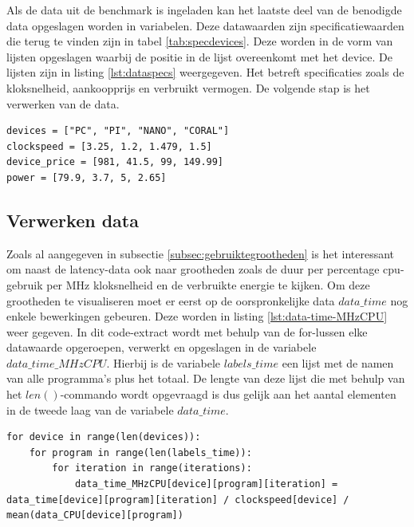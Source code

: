	Als de data uit de benchmark is ingeladen kan het laatste deel van de benodigde data opgeslagen worden in variabelen. Deze datawaarden zijn specificatiewaarden die terug te vinden zijn in tabel \ref{tab:specdevices}. Deze worden in de vorm van lijsten opgeslagen waarbij de positie in de lijst overeenkomt met het device. De lijsten zijn in listing \ref{lst:dataspecs} weergegeven. Het betreft specificaties zoals de kloksnelheid, aankoopprijs en verbruikt vermogen. De volgende stap is het verwerken van de data.
	
	\newpage
	
		\begin{lstlisting}[caption={Data uit de specificaties voor elk toestel.},captionpos=b, label = {lst:dataspecs}]
devices = ["PC", "PI", "NANO", "CORAL"]
clockspeed = [3.25, 1.2, 1.479, 1.5]
device_price = [981, 41.5, 99, 149.99]
power = [79.9, 3.7, 5, 2.65]
\end{lstlisting}	

	\subsection{Verwerken data}
	
	Zoals al aangegeven in subsectie \ref{subsec:gebruiktegrootheden} is het interessant om naast de latency-data ook naar grootheden zoals de duur per percentage \gls{cpu}-gebruik per MHz kloksnelheid en de verbruikte energie te kijken. Om deze grootheden te visualiseren moet er eerst op de oorspronkelijke data $data\_time$ nog enkele bewerkingen gebeuren. Deze worden in listing \ref{lst:data-time-MHzCPU} weer gegeven. In dit code-extract wordt met behulp van de for-lussen elke datawaarde opgeroepen, verwerkt en opgeslagen in de variabele $data\_time\_MHzCPU$. Hierbij is de variabele $labels\_time$ een lijst met de namen van alle programma's plus het totaal. De lengte van deze lijst die met behulp van het $len()$-commando wordt opgevraagd is dus gelijk aan het aantal elementen in de tweede laag van de variabele $data\_time$. 

		\begin{lstlisting}[caption={Verwerking van data\_time naar data\_time\_MHzCPU.},captionpos=b, label = {lst:data-time-MHzCPU}]
for device in range(len(devices)):
	for program in range(len(labels_time)):
		for iteration in range(iterations):
			data_time_MHzCPU[device][program][iteration] = data_time[device][program][iteration] / clockspeed[device] / mean(data_CPU[device][program])
\end{lstlisting}	
	
